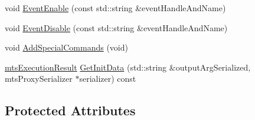 \begin{DoxyCompactItemize}
void \hyperlink{classmts_socket_proxy_server_a15fb0f2b7b457e74434f618f7b3c1b0d}{Event\+Enable} (const std\+::string \&event\+Handle\+And\+Name)
\item 
void \hyperlink{classmts_socket_proxy_server_a026fc4300e258e82f622f72fd7af1e6e}{Event\+Disable} (const std\+::string \&event\+Handle\+And\+Name)
\item 
void \hyperlink{classmts_socket_proxy_server_ae1e5bf81532c293525cadac52bc7d169}{Add\+Special\+Commands} (void)
\item 
\hyperlink{classmts_execution_result}{mts\+Execution\+Result} \hyperlink{classmts_socket_proxy_server_a08aa6a4f76551b78546ae525bde4f325}{Get\+Init\+Data} (std\+::string \&output\+Arg\+Serialized, mts\+Proxy\+Serializer $\ast$serializer) const 
\end{DoxyCompactItemize}
\subsection*{Protected Attributes}
